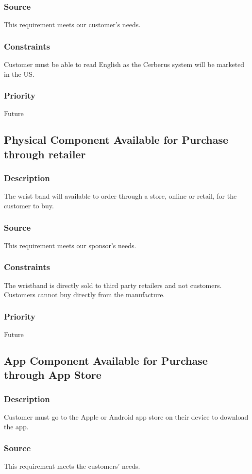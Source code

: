 \subsubsection{Source}
This requirement meets our customer's needs.
\subsubsection{Constraints}
Customer must be able to read English as the Cerberus system will be marketed in the US.
\subsubsection{Priority}
Future

\subsection{Physical Component Available for Purchase through retailer}
\subsubsection{Description}
The wrist band will available to order through a store, online or retail, for the customer to buy.
\subsubsection{Source}
This requirement meets our sponsor's needs.
\subsubsection{Constraints}
The wristband is directly sold to third party retailers and not customers. Customers cannot buy directly from the manufacture.
\subsubsection{Priority}
Future

\subsection{App Component Available for Purchase through App Store}
\subsubsection{Description}
Customer must go to the Apple or Android app store on their device to download the app.
\subsubsection{Source}
This requirement meets the customers' needs.
